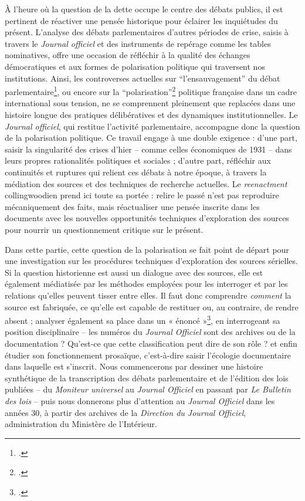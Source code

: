 À l’heure où la question de la dette occupe le centre des débats publics, il est pertinent de réactiver une pensée historique pour éclairer les inquiétudes du présent. L’analyse des débats parlementaires d’autres périodes de crise, saisis à travers le \emph{Journal officiel} et des instruments de repérage comme les tables nominatives, offre une occasion de réfléchir à la qualité des échanges démocratiques et aux formes de polarisation politique qui traversent nos institutions. Ainsi, les controverses actuelles sur \enquote{l’ensauvagement} du débat parlementaire\footcite[][]{ensauvagement}, ou encore sur la \enquote{polarisation}\footcite[][]{polarisation} politique française dans un cadre international sous tension, ne se comprennent pleinement que replacées dans une histoire longue des pratiques délibératives et des dynamiques institutionnelles. Le \emph{Journal officiel}, qui restitue l'activité parlementaire, accompagne donc la question de la polarisation politique. Ce travail engage à une double exigence : d’une part, saisir la singularité des crises d’hier -- comme celles économiques de 1931 -- dans leurs propres rationalités politiques et sociales ; d’autre part, réfléchir aux continuités et ruptures qui relient ces débats à notre époque, à travers la médiation des sources et des techniques de recherche actuelles. Le \emph{reenactment} collingwoodien prend ici toute sa portée : relire le passé n’est pas reproduire mécaniquement des faits, mais réactualiser une pensée inscrite dans les documents avec les nouvelles opportunités techniques d'exploration des sources pour nourrir un questionnement critique sur le présent.

Dans cette partie, cette question de la polarisation se fait point de départ pour une investigation sur les procédures techniques d’exploration des sources sérielles. Si la question historienne est aussi un dialogue avec des sources, elle est également médiatisée par les méthodes employées pour les interroger et par les relations qu’elles peuvent tisser entre elles. Il faut donc comprendre \emph{comment} la source est fabriquée, ce qu’elle est capable de restituer ou, au contraire, de rendre absent ; analyser également sa place dans un « énoncé »\footcite[][]{foucault}, en interrogeant sa position disciplinaire -- les numéros du \emph{Journal Officiel} sont des archives ou de la documentation ? Qu'est-ce que cette classification peut dire de son rôle ? et enfin étudier son fonctionnement prosaïque, c’est-à-dire saisir l’écologie documentaire dans laquelle est s'inscrit. Nous commencerons par dessiner une histoire synthétique de la transcription des débats parlementaire et de l'édition des lois publiées -- du \emph{Moniteur universel} au \emph{Journal Officiel} en passant par \emph{Le Bulletin des lois} -- puis nous donnerons plus d'attention au \emph{Journal Officiel} dans les années 30, à partir des archives de la \emph{Direction du Journal Officiel}, administration du Ministère de l'Intérieur.

